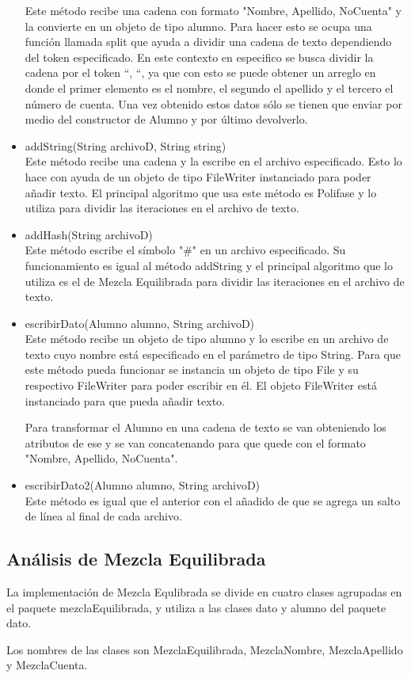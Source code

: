 \documentclass[11pt]{article}
\begin{document}
\begin{itemize}
Este método recibe una cadena con formato "Nombre, Apellido, NoCuenta" y la convierte en un objeto de tipo alumno. Para hacer esto se ocupa una función llamada split que ayuda a dividir una cadena de texto dependiendo del token especificado. En este contexto en especifico se busca dividir la cadena por el token “, “, ya que con esto se puede obtener un arreglo en donde el primer elemento es el nombre, el segundo el apellido y el tercero el número de cuenta. Una vez obtenido estos datos sólo se tienen que enviar por medio del constructor de Alumno y por último devolverlo.
\item addString(String archivoD, String string) \\
Este método recibe una cadena y la escribe en el archivo especificado. Esto lo hace con ayuda de un objeto de tipo FileWriter instanciado para poder añadir texto. El principal algoritmo que usa este método es Polifase y lo utiliza para dividir las iteraciones en el archivo de texto.
\item addHash(String archivoD) \\
Este método escribe el símbolo "\#" en un archivo especificado. Su funcionamiento es igual al método addString y el principal algoritmo que lo utiliza es el de Mezcla Equilibrada para dividir las iteraciones en el archivo de texto.
\item escribirDato(Alumno alumno, String archivoD) \\
Este método recibe un objeto de tipo alumno y lo escribe en un archivo de texto cuyo nombre está especificado en el parámetro de tipo String.  Para que este método pueda funcionar se instancia un objeto de tipo File y su respectivo FileWriter para poder escribir en él. El objeto FileWriter está instanciado para que pueda añadir texto. 
\par
Para transformar el Alumno en una cadena de texto se van obteniendo los atributos de ese y se van concatenando para que quede con el formato "Nombre, Apellido, NoCuenta".
\item escribirDato2(Alumno alumno, String archivoD)\\
Este método es igual que el anterior con el añadido de que se agrega un salto de línea al final de cada archivo.
\end{itemize}

\subsection{Análisis de Mezcla Equilibrada}
La implementación de Mezcla Equlibrada se divide en cuatro clases agrupadas en el paquete mezclaEquilibrada, y utiliza a las  clases dato y alumno del paquete dato.
\par
Los nombres de las clases son MezclaEquilibrada, MezclaNombre, MezclaApellido y MezclaCuenta.
\end{document}
